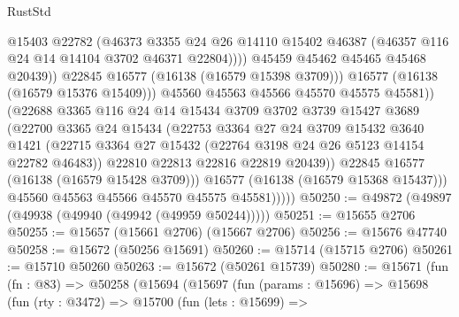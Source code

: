 \begin{lexlean}{RustStd}
\begin{coremodule}
                                @15403
                                @22782
                                (@46373
                                  @3355
                                  @24
                                  @26
                                  @14110
                                  @15402
                                  @46387
                                  (@46357 @116 @24 @14 @14104 @3702 @46371 @22804))))
                            @45459
                            @45462
                            @45465
                            @45468
                            @20439))
                        @22845
                        @16577
                        (@16138 (@16579 @15398 @3709)))
                      @16577
                      (@16138 (@16579 @15376 @15409)))
                    @45560
                    @45563
                    @45566
                    @45570
                    @45575
                    @45581))
                (@22688
                  @3365
                  @116
                  @24
                  @14
                  @15434
                  @3709
                  @3702
                  @3739
                  @15427
                  @3689
                  (@22700
                    @3365
                    @24
                    @15434
                    (@22753
                      @3364
                      @27
                      @24
                      @3709
                      @15432
                      @3640
                      @1421
                      (@22715 @3364 @27 @15432 (@22764 @3198 @24 @26 @5123 @14154 @22782 @46483))
                      @22810
                      @22813
                      @22816
                      @22819
                      @20439))
                  @22845
                  @16577
                  (@16138 (@16579 @15428 @3709)))
                @16577
                (@16138 (@16579 @15368 @15437)))
              @45560
              @45563
              @45566
              @45570
              @45575
              @45581)))))
@50250 := @49872 (@49897 (@49938 (@49940 (@49942 (@49959 @50244)))))
@50251 := @15655 @2706
@50255 := @15657 (@15661 @2706) (@15667 @2706)
@50256 := @15676 @47740
@50258 := @15672 (@50256 @15691)
@50260 := @15714 (@15715 @2706)
@50261 := @15710 @50260
@50263 := @15672 (@50261 @15739)
@50280 := @15671
    (fun (fn : @83) =>
    @50258
      (@15694
        (@15697
          (fun (params : @15696) =>
          @15698
            (fun (rty : @3472) =>
            @15700
              (fun (lets : @15699) =>

\end{coremodule}
\end{lexlean}
